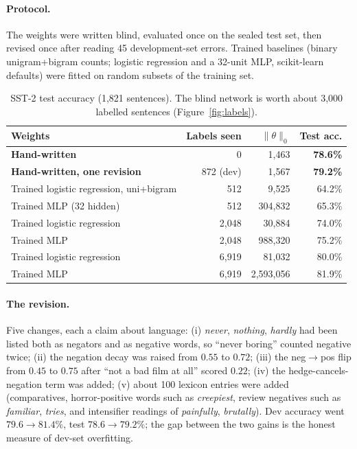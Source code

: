 \paragraph{Protocol.} The weights were written blind, evaluated once on the sealed
test set, then revised once after reading 45 development-set errors. Trained baselines
(binary unigram+bigram counts; logistic regression and a 32-unit MLP, scikit-learn
defaults) were fitted on random subsets of the training set.

\begin{table}[h]\centering
\begin{tabular}{lrrr}\toprule
Weights & Labels seen & $\|\theta\|_0$ & Test acc.\\\midrule
\textbf{Hand-written} & 0 & 1{,}463 & \textbf{78.6\%}\\
\textbf{Hand-written, one revision} & 872 (dev) & 1{,}567 & \textbf{79.2\%}\\
Trained logistic regression, uni+bigram & 512 & 9{,}525 & 64.2\%\\
Trained MLP (32 hidden) & 512 & 304{,}832 & 65.3\%\\
Trained logistic regression & 2{,}048 & 30{,}884 & 74.0\%\\
Trained MLP & 2{,}048 & 988{,}320 & 75.2\%\\
Trained logistic regression & 6{,}919 & 81{,}032 & 80.0\%\\
Trained MLP & 6{,}919 & 2{,}593{,}056 & 81.9\%\\
\bottomrule\end{tabular}
\caption{SST-2 test accuracy (1{,}821 sentences). The blind network is worth about
3{,}000 labelled sentences (Figure~\ref{fig:labels}).}
\label{tab:sst2}
\end{table}

\paragraph{The revision.} Five changes, each a claim about language: (i)
\emph{never}, \emph{nothing}, \emph{hardly} had been listed both as negators and as
negative words, so ``never boring'' counted negative twice; (ii) the negation decay
was raised from $0.55$ to $0.72$; (iii) the neg$\to$pos flip from $0.45$ to $0.75$
after ``not a bad film at all'' scored $0.22$; (iv) the hedge-cancels-negation term
was added; (v) about 100 lexicon entries were added (comparatives, horror-positive
words such as \emph{creepiest}, review negatives such as \emph{familiar},
\emph{tries}, and intensifier readings of \emph{painfully}, \emph{brutally}). Dev
accuracy went $79.6\to81.4\%$, test $78.6\to79.2\%$; the gap between the two gains
is the honest measure of dev-set overfitting.

